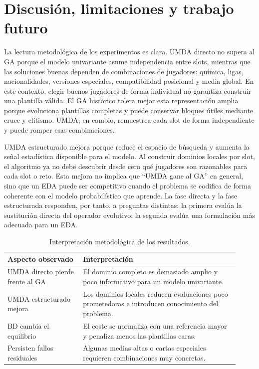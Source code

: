 \documentclass[10pt,a4paper]{article}
\begin{document}
\section{Discusión, limitaciones y trabajo futuro}

La lectura metodológica de los experimentos es clara. UMDA directo no supera al GA porque el modelo univariante asume independencia entre slots, mientras que las soluciones buenas dependen de combinaciones de jugadores: química, ligas, nacionalidades, versiones especiales, compatibilidad posicional y media global. En este contexto, elegir buenos jugadores de forma individual no garantiza construir una plantilla válida. El GA histórico tolera mejor esta representación amplia porque evoluciona plantillas completas y puede conservar bloques útiles mediante cruce y elitismo. UMDA, en cambio, remuestrea cada slot de forma independiente y puede romper esas combinaciones.

UMDA estructurado mejora porque reduce el espacio de búsqueda y aumenta la señal estadística disponible para el modelo. Al construir dominios locales por slot, el algoritmo ya no debe descubrir desde cero qué jugadores son razonables para cada slot o reto. Esta mejora no implica que ``UMDA gane al GA'' en general, sino que un EDA puede ser competitivo cuando el problema se codifica de forma coherente con el modelo probabilístico que aprende. La fase directa y la fase estructurada responden, por tanto, a preguntas distintas: la primera evalúa la sustitución directa del operador evolutivo; la segunda evalúa una formulación más adecuada para un EDA.

\begin{table}[h]
\centering
\small
\begin{tabular}{p{0.30\linewidth}p{0.62\linewidth}}
\toprule
Aspecto observado & Interpretación \\
\midrule
UMDA directo pierde frente al GA & El dominio completo es demasiado amplio y poco informativo para un modelo univariante. \\
UMDA estructurado mejora & Los dominios locales reducen evaluaciones poco prometedoras e introducen conocimiento del problema. \\
BD cambia el equilibrio & El coste se normaliza con una referencia mayor y penaliza menos las plantillas caras. \\
Persisten fallos residuales & Algunas medias altas o cartas especiales requieren combinaciones muy concretas. \\
\bottomrule
\end{tabular}
\caption{Interpretación metodológica de los resultados.}
\label{tab:interpretacion}
\end{table}
\end{document}

